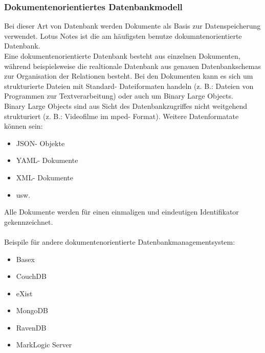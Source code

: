 \documentclass[12pt,a4paper]{report}
\begin{document}
\begin{onehalfspace}
\subsubsection{Dokumentenorientiertes Datenbankmodell}
Bei dieser Art von Datenbank werden Dokumente als Basis zur Datenspeicherung verwendet. Lotus Notes ist die am häufigsten benutze dokumntenorientierte Datenbank.\\

Eine dokumentenorientierte Datenbank besteht aus einzelnen Dokumenten, während beispielsweise die realtionale Datenbank aus genauen Datenbankschemas zur Organisation der Relationen besteht. Bei den Dokumenten kann es sich um strukturierte Dateien mit Standard- Dateiformaten handeln (z. B.: Dateien von Programmen zur Textverarbeitung) oder auch um Binary Large Objects.\\

Binary Large Objects sind aus Sicht des Datenbankzugriffes nicht weitgehend strukturiert (z. B.: Videofilme im mped- Format). Weitere Datenformatate können sein:
\begin{itemize}
\item JSON- Objekte
\item YAML- Dokumente
\item XML- Dokumente
\item usw.
\end{itemize}
Alle Dokumente werden für einen einmaligen und eindeutigen Identifikator gekennzeichnet.\\
\\Beispile für andere dokumentenorientierte Datenbankmanagementsystem:
\begin{itemize}
\item Basex
\item CouchDB
\item eXist
\item MongoDB
\item RavenDB
\item MarkLogic Server
\end{itemize}


\end{onehalfspace}
\end{document}
